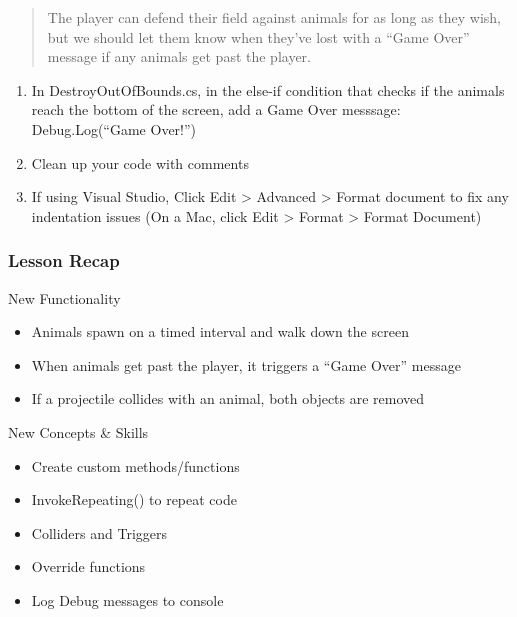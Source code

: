 \documentclass[
]{book}
\providecommand{\tightlist}{%
  \setlength{\itemsep}{0pt}\setlength{\parskip}{0pt}}
\begin{document}
\begin{quote}
The player can defend their field against animals for as long as they wish, but we should let them know when they've lost with a ``Game Over'' message if any animals get past the player.
\end{quote}

\begin{enumerate}
\def\labelenumi{\arabic{enumi}.}
\tightlist
\item
  In DestroyOutOfBounds.cs, in the else-if condition that checks if the animals reach the bottom of the screen, add a Game Over messsage:
  Debug.Log(``Game Over!'')
\item
  Clean up your code with comments
\item
  If using Visual Studio, Click Edit \textgreater{} Advanced \textgreater{} Format document to fix any indentation issues
  (On a Mac, click Edit \textgreater{} Format \textgreater{} Format Document)
\end{enumerate}

\hypertarget{lesson-recap-3}{%
\subsubsection{Lesson Recap}\label{lesson-recap-3}}

New Functionality

\begin{itemize}
\tightlist
\item
  Animals spawn on a timed interval and walk down the screen
\item
  When animals get past the player, it triggers a ``Game Over'' message
\item
  If a projectile collides with an animal, both objects are removed
\end{itemize}

New Concepts \& Skills

\begin{itemize}
\tightlist
\item
  Create custom methods/functions
\item
  InvokeRepeating() to repeat code
\item
  Colliders and Triggers
\item
  Override functions
\item
  Log Debug messages to console
\end{itemize}

  
\end{document}
